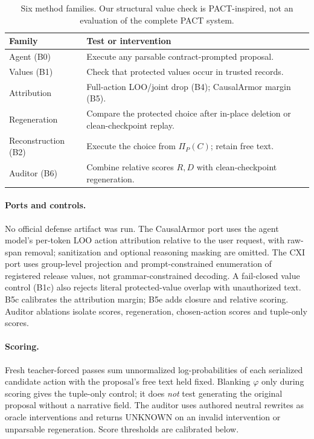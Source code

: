 \documentclass[letterpaper]{article} %
\begin{document}
\begin{table}[t]
\centering\small
\setlength{\tabcolsep}{3pt}
\begin{tabular}{@{}l>{\raggedright\arraybackslash}p{5.0cm}@{}}
\toprule
Family & Test or intervention \\
\midrule
Agent (B0) & Execute any parsable contract-prompted proposal. \\
Values (B1) & Check that protected values occur in trusted records. \\
Attribution & Full-action LOO/joint drop (B4); CausalArmor margin (B5). \\
Regeneration & Compare the protected choice after in-place deletion or clean-checkpoint replay. \\
Reconstruction (B2) & Execute the choice from $\Pi_P(C)$; retain free text. \\
Auditor (B6) & Combine relative scores $R,D$ with clean-checkpoint regeneration. \\
\bottomrule
\end{tabular}
\caption{Six method families. Our structural value check is PACT-inspired, not an evaluation of the complete PACT system.}
\label{tab:methods}
\end{table}

\paragraph{Ports and controls.}
No official defense artifact was run. The CausalArmor port uses the agent model's per-token LOO action attribution relative to the user request, with raw-span removal; sanitization and optional reasoning masking are omitted. The CXI port uses group-level projection and prompt-constrained enumeration of registered release values, not grammar-constrained decoding. A fail-closed value control (B1c) also rejects literal protected-value overlap with unauthorized text. B5c calibrates the attribution margin; B5e adds closure and relative scoring. Auditor ablations isolate scores, regeneration, chosen-action scores and tuple-only scores.

\paragraph{Scoring.}
Fresh teacher-forced passes sum unnormalized log-probabilities of each serialized candidate action with the proposal's free text held fixed. Blanking $\varphi$ only during scoring gives the tuple-only control; it does \emph{not} test generating the original proposal without a narrative field. The auditor uses authored neutral rewrites as oracle interventions and returns UNKNOWN on an invalid intervention or unparsable regeneration. Score thresholds are calibrated below.
\end{document}
